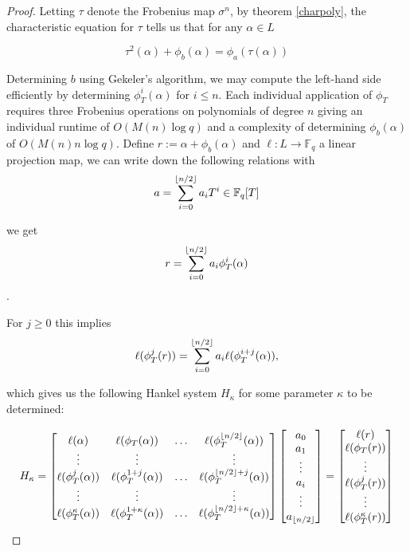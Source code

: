 \documentclass{jams-l}
\theoremstyle{remark}
\numberwithin{equation}{section}
\DeclarePairedDelimiter\floor{\lfloor}{\rfloor}
\begin{document}
\begin{proof}
Letting $\tau$ denote the Frobenius map $\sigma^n$, by theorem \ref{charpoly}, the characteristic equation for $\tau$ tells us that for any $\alpha \in L$

\[\tau^2(\alpha) + \phi_b(\alpha) = \phi_a(\tau(\alpha))\]

Determining $b$ using Gekeler's algorithm, we may compute the left-hand side efficiently by determining $\phi_T^i(\alpha)$ for $i \leq n$. Each individual application of $\phi_T$ requires three Frobenius operations on polynomials of degree $n$ giving an individual runtime of $O(M(n) \log q)$ and a complexity of determining $\phi_b(\alpha)$ of $O(M(n) n \log q)$.  Define $r := \alpha + \phi_b(\alpha)$ and $\ell: L \to \mathbb{F}_q$ a linear projection map, we can write down the following relations with
\[a = \sum_{i = 0}^{\floor*{n/2}}a_iT^i \in \mathbb{F}_q[T]\]

\noindent we get
\[ r = \sum_{i = 0}^{\floor*{n/2}}a_i\phi_T^i(\alpha) \].

\noindent For $j \geq 0$ this implies
\[\ell(\phi_T^j(r)) = \sum_{i = 0}^{\floor*{n/2}}a_i\ell(\phi_T^{i+j}(\alpha)),\]

\noindent which gives us the following Hankel system $H_{\kappa}$ for some parameter $\kappa$ to be determined:

\[H_{\kappa} = \begin{bmatrix}\ell(\alpha) & \ell(\phi_T(\alpha)) & \ldots & \ell(\phi_T^{\floor*{n/2}}(\alpha)) \\ \vdots & \vdots & & \vdots \\ 

\ell(\phi_T^{j}(\alpha)) & \ell(\phi_T^{1+j}(\alpha)) & \ldots & \ell(\phi_T^{\floor*{n/2}+j}(\alpha)) \\ \vdots & \vdots & & \vdots \\

\ell(\phi_T^{\kappa}(\alpha)) & \ell(\phi_T^{1 + \kappa }(\alpha)) & \ldots & \ell(\phi_T^{\floor*{n/2} + \kappa}(\alpha))

\end{bmatrix} \begin{bmatrix} a_0 \\ a_1 \\ \vdots \\ a_i \\ \vdots \\ a_{\floor*{n/2}} \end{bmatrix} = \begin{bmatrix} \ell(r) \\ \ell(\phi_T(r)) \\ \vdots \\ \ell(\phi_T^j(r)) \\ \vdots  \\   \ell(\phi_T^{\kappa}(r)) \end{bmatrix} \]


\end{proof}
\end{document}

